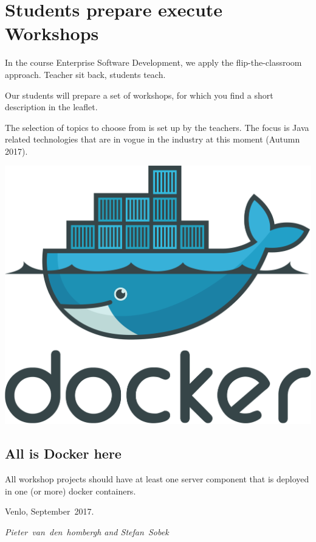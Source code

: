 \section*{Students prepare execute Workshops}
In the course Enterprise Software Development, we apply the
flip-the-classroom approach. Teacher sit back, students teach. 

Our students will prepare a set of workshops, for which you find a short
description in the leaflet.

The selection of topics to choose from is set up by the teachers. The
focus is Java related technologies that are in vogue in the industry
at this moment (Autumn 2017).

\hfill\includegraphics[width=.4\linewidth]{images/docker.pdf}

\subsection*{All is Docker here}
All workshop projects should have at least one server component that is deployed
in one (or more)  docker containers. 

Venlo, September~2017.

\hfill\textit{Pieter~van~den~hombergh and Stefan~Sobek} 
